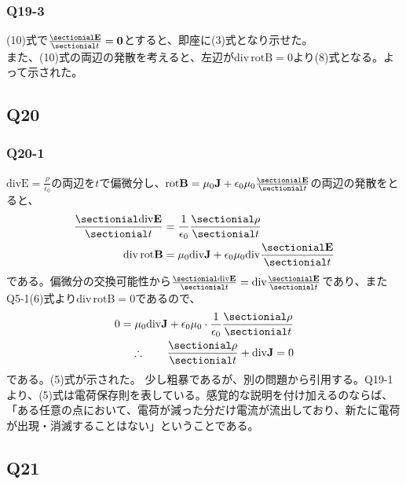 \documentclass[platex,dvipdfmx,a4paper]{jsarticle}
\newcommand{\hb}[2]{\frac{\sectionial #1}{\sectionial #2}}
\newcommand{\vect}[1]{\boldsymbol{\mathrm{#1}}}
\begin{document}
  \subsubsection*{Q19-3}
  (10)式で$\hb{\vect{E}}{t}=\vect{0}$とすると、即座に(3)式となり示せた。\\
  また、(10)式の両辺の発散を考えると、左辺が$\mathrm{div}\,\mathrm{rot}\vect{B}=0$より(8)式となる。よって示された。




  \subsection*{Q20}
  \subsubsection*{Q20-1}
  $\mathrm{div}\vect{E}=\frac{\rho}{\epsilon_0}$の両辺を$t$で偏微分し、$\mathrm{rot}\vect{B}=\mu_0 \vect{J}+\epsilon_0\mu_0\hb{\vect{E}}{t}$の両辺の発散をとると、
  \begin{align*}
    \hb{\mathrm{div}\vect{E}}{t} &= \frac{1}{\epsilon_0}\hb{\rho}{t}\\
    \mathrm{div}\,\mathrm{rot}\vect{B} &= \mu_0\mathrm{div}\vect{J}+\epsilon_0\mu_0\mathrm{div}\hb{\vect{E}}{t}
  \end{align*}
  である。偏微分の交換可能性から$\hb{\mathrm{div}\vect{E}}{t}=\mathrm{div}\hb{\vect{E}}{t}$であり、またQ5-1(6)式より$\mathrm{div}\,\mathrm{rot}\vect{B}=0$であるので、
  \begin{align*}
    0 = \mu_0\mathrm{div}\vect{J}+\epsilon_0\mu_0\cdot\frac{1}{\epsilon_0}\hb{\rho}{t}\\
    \therefore \qquad \hb{\rho}{t}+\mathrm{div}\vect{J}=0
  \end{align*}
  である。(5)式が示された。
  少し粗暴であるが、別の問題から引用する。Q19-1より、(5)式は電荷保存則を表している。感覚的な説明を付け加えるのならば、「ある任意の点において、電荷が減った分だけ電流が流出しており、新たに電荷が出現・消滅することはない」ということである。





  \subsection*{Q21}
\end{document}
